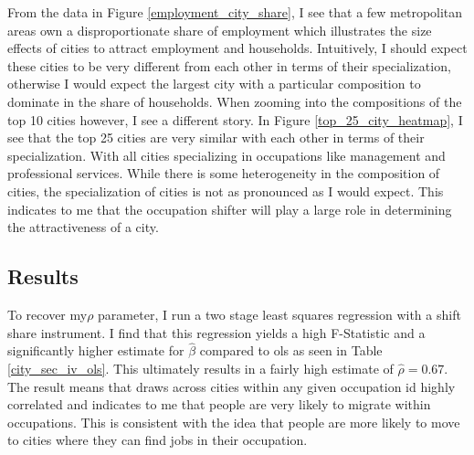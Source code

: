 \documentclass[10pt]{article}
\begin{document}
From the data in Figure \ref{employment_city_share}, I see that a few metropolitan areas own a disproportionate share of employment which illustrates the size effects of cities to attract employment and households. Intuitively, I should expect these cities to be very different from each other in terms of their specialization, otherwise I would expect the largest city with a particular composition to dominate in the share of households. When zooming into the compositions of the top 10 cities however, I see a different story. In Figure \ref{top_25_city_heatmap}, I see that the top 25 cities are very similar with each other in terms of their specialization. With all cities specializing in occupations like management and professional services. While there is some heterogeneity in the composition of cities, the specialization of cities is not as pronounced as I would expect. This indicates to me that the occupation shifter will play a large role in determining the attractiveness of a city.

\subsection{Results}

To recover my$\rho$ parameter, I run a two stage least squares regression with a shift share instrument. I find that this regression yields a high F-Statistic and a significantly higher estimate for $\hat{\beta}$ compared to ols as seen in Table \ref{city_sec_iv_ols}. This ultimately results in a fairly high estimate of $\hat{\rho} = 0.67$. The result means that draws across cities within any given occupation id highly correlated and indicates to me that people are very likely to migrate within occupations. This is consistent with the idea that people are more likely to move to cities where they can find jobs in their occupation.

%         
%         
\end{document}
